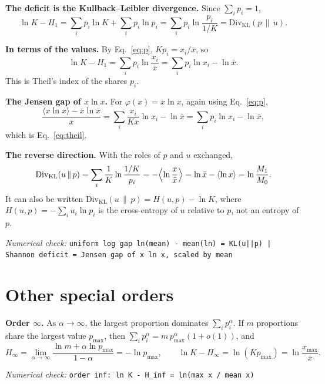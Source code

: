 \documentclass[11pt]{article}
\newcommand{\Div}{\mathrm{Div}}
\newcommand{\KL}{\Div_{\mathrm{KL}}}
\newcommand{\numcheck}[1]{\par{\small\raggedright\noindent\textit{Numerical check:} \texttt{#1}\par}}
\begin{document}
\textbf{The deficit is the Kullback--Leibler divergence.} Since $\sum_ip_i=1$,
\begin{equation}
\ln K - H_1 = \sum_i p_i\ln K + \sum_i p_i\ln p_i = \sum_i p_i\ln\frac{p_i}{1/K} = \KL(p\,\|\,u) .
\end{equation}

\textbf{In terms of the values.} By Eq.~\eqref{eq:p}, $Kp_i = x_i/\bar x$, so
\begin{equation}
\ln K - H_1 = \sum_i p_i\ln\frac{x_i}{\bar x} = \sum_i p_i\ln x_i - \ln\bar x .
\label{eq:theil}
\end{equation}
This is Theil's index of the shares $p_i$.

\textbf{The Jensen gap of $x\ln x$.} For $\varphi(x)=x\ln x$, again using Eq.~\eqref{eq:p},
\begin{equation}
\frac{\langle x\ln x\rangle - \bar x\ln\bar x}{\bar x} = \sum_i\frac{x_i}{K\bar x}\ln x_i - \ln\bar x
= \sum_i p_i\ln x_i - \ln\bar x ,
\end{equation}
which is Eq.~\eqref{eq:theil}.

\textbf{The reverse direction.} With the roles of $p$ and $u$ exchanged,
\begin{equation}
\KL(u\,\|\,p) = \sum_i\frac1K\ln\frac{1/K}{p_i} = -\Bigl\langle\ln\frac{x}{\bar x}\Bigr\rangle = \ln\bar x - \langle\ln x\rangle = \ln\frac{M_1}{M_0} .
\label{eq:reverse}
\end{equation}
It can also be written $\KL(u\,\|\,p) = H(u,p) - \ln K$, where $H(u,p) = -\sum_i u_i\ln p_i$ is the cross-entropy
of $u$ relative to $p$, not an entropy of $p$.
\numcheck{uniform log gap ln(mean) - mean(ln) = KL(u||p) | Shannon deficit = Jensen gap of x ln x, scaled by mean}

\section{Other special orders}

\textbf{Order $\infty$.} As $\alpha\to\infty$, the largest proportion dominates $\sum_ip_i^{\alpha}$. If $m$
proportions share the largest value $p_{\max}$, then $\sum_ip_i^{\alpha} = m\,p_{\max}^{\alpha}(1+o(1))$, and
\begin{equation}
H_\infty = \lim_{\alpha\to\infty}\frac{\ln m + \alpha\ln p_{\max}}{1-\alpha} = -\ln p_{\max} ,
\qquad
\ln K - H_\infty = \ln(Kp_{\max}) = \ln\frac{x_{\max}}{\bar x} .
\end{equation}
\numcheck{order inf: ln K - H\_inf = ln(max x / mean x)}
\end{document}
